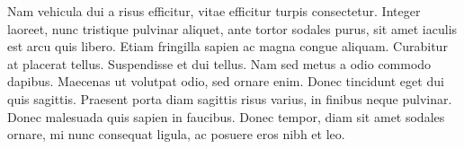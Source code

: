 \documentclass{article}
\begin{document}
	Nam vehicula dui a risus efficitur, vitae efficitur turpis consectetur. Integer laoreet, nunc tristique pulvinar aliquet, ante tortor sodales purus, sit amet iaculis est arcu quis libero. Etiam fringilla sapien ac magna congue aliquam. Curabitur at placerat tellus. Suspendisse et dui tellus. Nam sed metus a odio commodo dapibus. Maecenas ut volutpat odio, sed ornare enim. Donec tincidunt eget dui quis sagittis. Praesent porta diam sagittis risus varius, in finibus neque pulvinar. Donec malesuada quis sapien in faucibus. Donec tempor, diam sit amet sodales ornare, mi nunc consequat ligula, ac posuere eros nibh et leo. 
	
\end{document}
